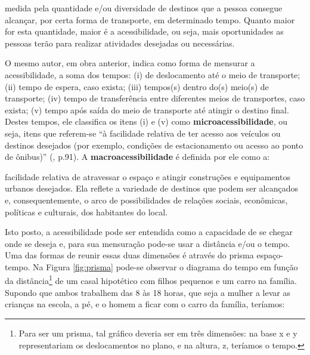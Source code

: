\begin{citacao}
medida pela quantidade e/ou diversidade de destinos que a pessoa consegue alcançar, por certa forma de transporte, em determinado tempo. Quanto maior for esta quantidade, maior é a acessibilidade, ou seja, mais oportunidades as pessoas terão para realizar atividades desejadas ou necessárias. \cite[p.42]{VASCONCELLOS2012}
\end{citacao}

O mesmo autor, em obra anterior, indica como forma de mensurar a acessibilidade, a soma dos tempos: (i) de deslocamento até o meio de transporte; (ii) tempo de espera, caso exista; (iii) tempos(s) dentro do(s) meio(s) de transporte; (iv) tempo de transferência entre diferentes meios de transportes, caso exista; (v) tempo após saída do meio de transporte até atingir o destino final. Destes tempos, ele classifica os itens (i) e (v) como \textbf{microacessibilidade}, ou seja, itens que referem-se ``à facilidade relativa de ter acesso aos veículos ou destinos desejados (por exemplo, condições de estacionamento ou acesso ao ponto de ônibus)'' (\citeyear{VASCONCELLOS2001}, p.91). A \textbf{macroacessibilidade} é definida por ele como a:

\begin{citacao}
facilidade relativa de atravessar o espaço e atingir construções e equipamentos urbanos desejados. Ela reflete a variedade de destinos que podem ser alcançados e, consequentemente, o arco de possibilidades de relações sociais, econômicas, políticas e culturais, dos habitantes do local. \cite[p.91]{VASCONCELLOS2001}
\end{citacao}

Isto posto, a acessibilidade pode ser entendida como a capacidade de se chegar onde se deseja e, para sua mensuração pode-se usar a distância e/ou o tempo. Uma das formas de reunir essas duas dimensões é através do prisma espaço-tempo. Na Figura \ref{fig:prisma} pode-se observar o diagrama do tempo em função da distância\footnote{Para ser um prisma, tal gráfico deveria ser em três dimensões: na base x e y representariam os deslocamentos no plano, e na altura, z, teríamos o tempo.} de um casal hipotético com filhos pequenos e um carro na família. Supondo que ambos trabalhem das 8 às 18 horas, que seja a mulher a levar as crianças na escola, a pé, e o homem a ficar com o carro da família, teríamos:

